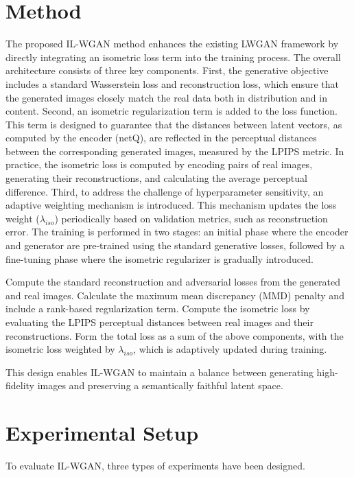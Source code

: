 \documentclass{article} %
\begin{document}
\section{Method}
\label{sec:method}
The proposed IL-WGAN method enhances the existing LWGAN framework by directly integrating an isometric loss term into the training process. The overall architecture consists of three key components. First, the generative objective includes a standard Wasserstein loss and reconstruction loss, which ensure that the generated images closely match the real data both in distribution and in content. Second, an isometric regularization term is added to the loss function. This term is designed to guarantee that the distances between latent vectors, as computed by the encoder (netQ), are reflected in the perceptual distances between the corresponding generated images, measured by the LPIPS metric. In practice, the isometric loss is computed by encoding pairs of real images, generating their reconstructions, and calculating the average perceptual difference. Third, to address the challenge of hyperparameter sensitivity, an adaptive weighting mechanism is introduced. This mechanism updates the loss weight (\(\lambda_{iso}\)) periodically based on validation metrics, such as reconstruction error. The training is performed in two stages: an initial phase where the encoder and generator are pre-trained using the standard generative losses, followed by a fine-tuning phase where the isometric regularizer is gradually introduced.

\begin{algorithm}[H]
\begin{algorithmic}
  \State Compute the standard reconstruction and adversarial losses from the generated and real images.
  \State Calculate the maximum mean discrepancy (MMD) penalty and include a rank-based regularization term.
  \State Compute the isometric loss by evaluating the LPIPS perceptual distances between real images and their reconstructions.
  \State Form the total loss as a sum of the above components, with the isometric loss weighted by \(\lambda_{iso}\), which is adaptively updated during training.
\end{algorithmic}
\end{algorithm}

This design enables IL-WGAN to maintain a balance between generating high-fidelity images and preserving a semantically faithful latent space.

\section{Experimental Setup}
\label{sec:experimental}
To evaluate IL-WGAN, three types of experiments have been designed.
\end{document}

